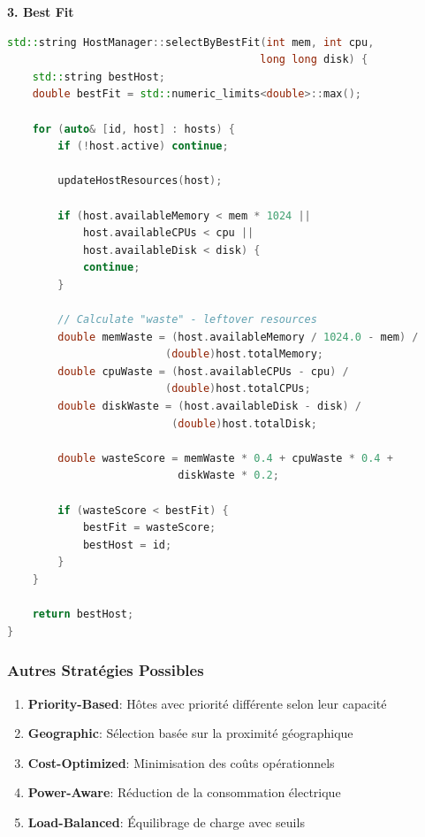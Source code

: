 \documentclass[12pt,a4paper]{article}
\begin{document}
\textbf{3. Best Fit}

\begin{lstlisting}[language=C++, caption=Stratégie Best Fit]
std::string HostManager::selectByBestFit(int mem, int cpu, 
                                        long long disk) {
    std::string bestHost;
    double bestFit = std::numeric_limits<double>::max();
    
    for (auto& [id, host] : hosts) {
        if (!host.active) continue;
        
        updateHostResources(host);
        
        if (host.availableMemory < mem * 1024 ||
            host.availableCPUs < cpu ||
            host.availableDisk < disk) {
            continue;
        }
        
        // Calculate "waste" - leftover resources
        double memWaste = (host.availableMemory / 1024.0 - mem) / 
                         (double)host.totalMemory;
        double cpuWaste = (host.availableCPUs - cpu) / 
                         (double)host.totalCPUs;
        double diskWaste = (host.availableDisk - disk) / 
                          (double)host.totalDisk;
        
        double wasteScore = memWaste * 0.4 + cpuWaste * 0.4 + 
                           diskWaste * 0.2;
        
        if (wasteScore < bestFit) {
            bestFit = wasteScore;
            bestHost = id;
        }
    }
    
    return bestHost;
}
\end{lstlisting}

\subsubsection{Autres Stratégies Possibles}

\begin{enumerate}
    \item \textbf{Priority-Based}: Hôtes avec priorité différente selon leur capacité
    \item \textbf{Geographic}: Sélection basée sur la proximité géographique
    \item \textbf{Cost-Optimized}: Minimisation des coûts opérationnels
    \item \textbf{Power-Aware}: Réduction de la consommation électrique
    \item \textbf{Load-Balanced}: Équilibrage de charge avec seuils
\end{enumerate}
\end{document}
